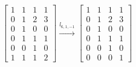 \documentclass{article}
\begin{document}
\begin{enumerate}
\begin{align*}
		\begin{bmatrix}
		1 & 1 & 1 & 1\\
		0 & 1 & 2 & 3\\
		0 & 1 & 0 & 0\\
		0 & 1 & 1 & 1\\
		0 & 0 & 1 & 0\\
		1 & 1 & 1 & 2
		\end{bmatrix}
		\stackrel{l_{6,1,-1}}{\to}
		\begin{bmatrix}
		1 & 1 & 1 & 1\\
		0 & 1 & 2 & 3\\
		0 & 1 & 0 & 0\\
		0 & 1 & 1 & 1\\
		0 & 0 & 1 & 0\\
		0 & 0 & 0 & 1
		\end{bmatrix}
		\end{align*}
		
	\end{enumerate}
	
\end{document}
